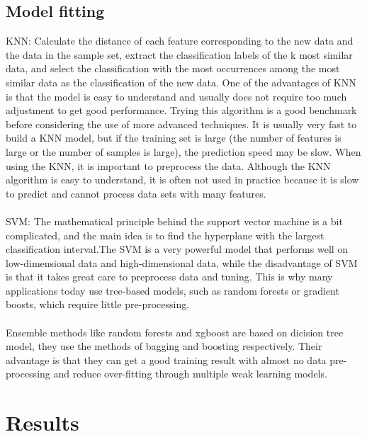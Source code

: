 \documentclass[12pt]{article}
\begin{document}
\subsection{Model fitting}
KNN: Calculate the distance of each feature corresponding to the new data and the data in the sample set, extract the classification labels of the k most similar data, and select the classification with the most occurrences among the most similar data as the classification of the new data. One of the advantages of KNN is that the model is easy to understand and usually does not require too much adjustment to get good performance. Trying this algorithm is a good benchmark before considering the use of more advanced techniques. It is usually very fast to build a KNN model,  but if the training set is large (the number of features is large or the number of samples is large), the prediction speed may be slow. When using the KNN, it is important to preprocess the data. Although the KNN algorithm is easy to understand, it is often not used in practice because it is slow to predict and cannot process data sets with many features.
\\
\\
SVM: The mathematical principle behind the support vector machine is a bit complicated, and the main idea is to find the hyperplane with the largest classification interval.The SVM is a very powerful model that performs well on low-dimensional data and high-dimensional data, while the disadvantage of SVM is that it takes great care to preprocess data and tuning. This is why many applications today use tree-based models, such as random forests or gradient boosts, which require little pre-processing. 
\\
\\
Ensemble methods like random forests and xgboost are based on dicision tree model, they use the methods of bagging and boosting respectively. Their advantage is that they can get a good training result with almost no data pre-processing and reduce over-fitting through multiple weak learning models. 



\section{Results}
\end{document}
